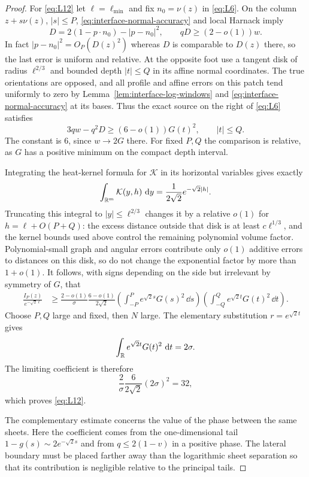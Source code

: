 \begin{proof}
For \eqref{eq:L12} let $\ell=\ell_{\min}$ and fix
$n_0=\nu(z)$ in \eqref{eq:L6}.  On the column $z+s\nu(z)$,
$|s|\le P$, \eqref{eq:interface-normal-accuracy} and local Harnack
imply
\[
 D=2(1-p\cdot n_0)-|p-n_0|^2,
 \qquad qD\ge(2-o(1))w.
\]
In fact $|p-n_0|^2=O_P(D(z)^2)$ whereas $D$ is comparable to
$D(z)$ there, so the last error is uniform and relative.
At the opposite foot use a tangent disk of radius $\ell^{2/3}$
and bounded depth $|t|\le Q$ in its affine normal coordinates.
The true orientations are opposed, and all profile and affine
errors on this patch tend uniformly to zero by
Lemma~\ref{lem:interface-log-windows} and
\eqref{eq:interface-normal-accuracy} at its bases.  Thus the exact
source on the right of \eqref{eq:L6} satisfies
\[
 3qw-q^2D\ge(6-o(1))G(t)^2,\qquad |t|\le Q.
\]
The constant is $6$, since $w\to2G$ there.
For fixed $P,Q$ the comparison is relative, as $G$ has a positive
minimum on the compact depth interval.

Integrating the heat-kernel formula for $\mathcal K$ in its
horizontal variables gives exactly
\[
 \int_{\mathbb R^m}\mathcal K(y,h)\,\,\mathrm d y
       =\frac1{2\sqrt2}e^{-\sqrt2|h|}.
\]
Truncating this integral to $|y|\le\ell^{2/3}$ changes it by a
relative $o(1)$ for $h=\ell+O(P+Q)$: the excess distance outside
that disk is at least $c\ell^{1/3}$, and the kernel bounds used
above control the remaining polynomial volume factor.
Polynomial-small graph and angular errors contribute only $o(1)$
additive errors to distances on this disk, so do not change the
exponential factor by more than $1+o(1)$.
It follows, with signs depending on the side but irrelevant by
symmetry of $G$, that
\[
 \begin{split}
 \frac{I_P(z)}{e^{-\sqrt2\ell}}
 &\ge \frac{2-o(1)}\sigma\frac{6-o(1)}{2\sqrt2}
 \left(\int_{-P}^{P}e^{\sqrt2s}G(s)^2\,\dd s\right)
 \left(\int_{-Q}^{Q}e^{\sqrt2t}G(t)^2\,\dd t\right).
 \end{split}
\]
Choose $P,Q$ large and fixed, then $N$ large.  The elementary
substitution $r=e^{\sqrt2t}$ gives
\[
 \int_\mathbb R e^{\sqrt2t}G(t)^2\,\,\mathrm d t=2\sigma.
\]
The limiting coefficient is therefore
\[
 \frac2\sigma\frac6{2\sqrt2}(2\sigma)^2=32,
\]
which proves \eqref{eq:L12}.

The complementary estimate concerns the value of the phase between
the same sheets.  Here the coefficient comes from the one-dimensional
tail $1-g(s)\sim2e^{-\sqrt2s}$ and from $q\le2(1-v)$ in a positive
phase.  The lateral boundary must be placed farther away than the
logarithmic sheet separation so that its contribution is negligible
relative to the principal tails.


\end{proof}
